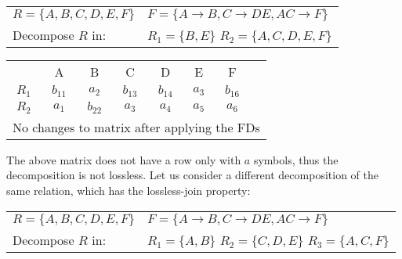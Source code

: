 \vspace{0.2cm}

\indent \begin{tabular}[h]{l l}
  $R = \{A, B, C, D, E, F\}$ & $F = \{A \rightarrow B, C \rightarrow DE, AC \rightarrow F\}$ \\
  Decompose $R$ in: & $R_1 = \{B, E\}$ $R_2 = \{A, C, D, E, F\}$\\
\end{tabular}

\vspace{0.2cm}

\footnotesize
\indent \begin{tabular}[h]{c|c|c|c|c|c|c|c}
  \cline{2-7}
  & A & B & C & D & E & F \\
  \cline{2-7}
  \cline{2-7}
  $R_1$ & $b_{11}$ & $a_2$ & $b_{13}$ & $b_{14}$ & $a_3$ & $b_{16}$ \\
  $R_2$ & $a_1$ & $b_{22}$ & $a_{3}$ & $a_4$ & $a_5$ & $a_6$ \\
  \cline{2-7}
  \multicolumn{8}{l}{No changes to matrix after applying the FDs}
\end{tabular}
\normalsize

\vspace{0.2cm}

The above matrix does not have a row only with $a$ symbols, thus the decomposition is 
not lossless. Let us consider a different decomposition of the same relation, which has
the lossless-join property:

\vspace{0.2cm}

\begin{tabular}[h]{l l}
  $R = \{A, B, C, D, E, F\}$ & $F = \{A \rightarrow B, C \rightarrow DE, AC \rightarrow F\}$ \\
  Decompose $R$ in: & $R_1 = \{A, B\}$ $R_2 = \{C, D, E\}$ $R_3 = \{A, C, F\}$\\
\end{tabular} 

\vspace{0.2cm}

